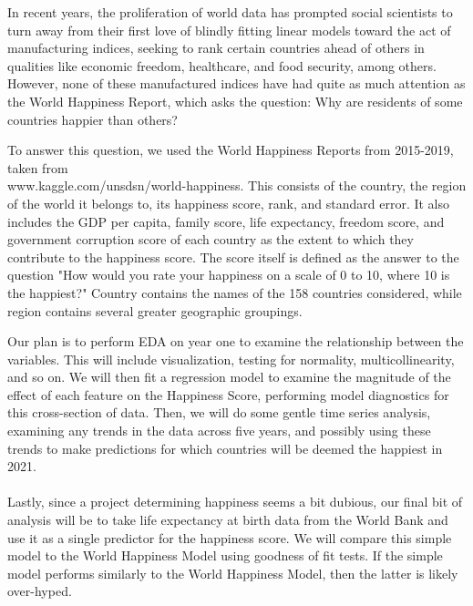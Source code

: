 \documentclass{homework}
\begin{document}
\maketitle

In recent years, the proliferation of world data has prompted social scientists to turn away from their first love of blindly fitting linear models toward the act of manufacturing indices, seeking to rank certain countries ahead of others in qualities like economic freedom, healthcare, and food security, among others. However, none of these manufactured indices have had quite as much attention as the World Happiness Report, which asks the question: Why are residents of some countries happier than others?

To answer this question, we used the World Happiness Reports from 2015-2019, taken from\\
www.kaggle.com/unsdsn/world-happiness. This consists of the country, the region of the world it belongs to, its happiness score, rank, and standard error. It also includes the GDP per capita, family score, life expectancy, freedom score, and government corruption score of each country as the extent to which they contribute to the happiness score. The score itself is defined as the answer to the question "How would you rate your happiness on a scale of 0 to 10, where 10 is the happiest?" Country contains the names of the 158 countries considered, while region contains several greater geographic groupings.

Our plan is to perform EDA on year one to examine the relationship between the variables. This will include visualization, testing for normality, multicollinearity, and so on. We will then fit a regression model to examine the magnitude of the effect of each feature on the Happiness Score, performing model diagnostics for this cross-section of data. Then, we will do some gentle time series analysis, examining any trends in the data across five years, and possibly using these trends to make predictions for which countries will be deemed the happiest in 2021.\\\\
Lastly, since a project determining happiness seems a bit dubious, our final bit of analysis will be to take life expectancy at birth data from the World Bank and use it as a single predictor for the happiness score. We will compare this simple model to the World Happiness Model using goodness of fit tests. If the simple model performs similarly to the World Happiness Model, then the latter is likely over-hyped.
\end{document}
